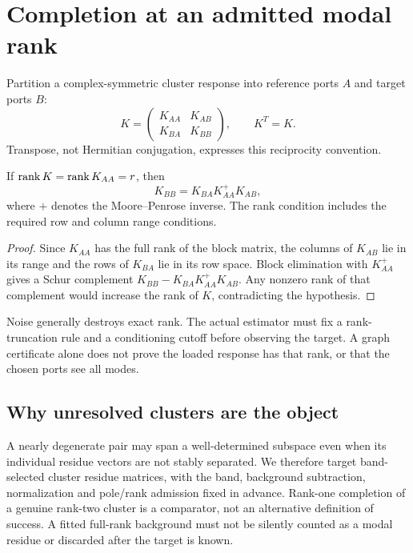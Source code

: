 \documentclass[11pt]{article}
\begin{document}
\section{Completion at an admitted modal rank}
Partition a complex-symmetric cluster response into reference ports $A$
and target ports $B$:
\[
 K=\begin{pmatrix}K_{AA}&K_{AB}\\K_{BA}&K_{BB}\end{pmatrix},
 \qquad K^T=K .
\]
Transpose, not Hermitian conjugation, expresses this reciprocity convention.

\begin{proposition}\label{prop:completion}
If $\operatorname{rank} K=\operatorname{rank} K_{AA}=r$, then
\begin{equation}\label{eq:completion}
 K_{BB}=K_{BA}K_{AA}^{+}K_{AB},
\end{equation}
where $+$ denotes the Moore--Penrose inverse. The rank condition includes
the required row and column range conditions.
\end{proposition}
\begin{proof}
Since $K_{AA}$ has the full rank of the block matrix, the columns of
$K_{AB}$ lie in its range and the rows of $K_{BA}$ lie in its row space.
Block elimination with $K_{AA}^{+}$ gives a Schur complement
$K_{BB}-K_{BA}K_{AA}^{+}K_{AB}$. Any nonzero rank of that complement
would increase the rank of $K$, contradicting the hypothesis.
\end{proof}
Noise generally destroys exact rank. The actual estimator must fix a
rank-truncation rule and a conditioning cutoff before observing the target.
A graph certificate alone does not prove the loaded response has that rank,
or that the chosen ports see all modes.

\subsection{Why unresolved clusters are the object}
A nearly degenerate pair may span a well-determined subspace even when its
individual residue vectors are not stably separated. We therefore target
band-selected cluster residue matrices, with the band, background subtraction,
normalization and pole/rank admission fixed in advance.
Rank-one completion of a genuine rank-two cluster is a comparator, not an
alternative definition of success. A fitted full-rank background must not
be silently counted as a modal residue or discarded after the target is known.
\end{document}
